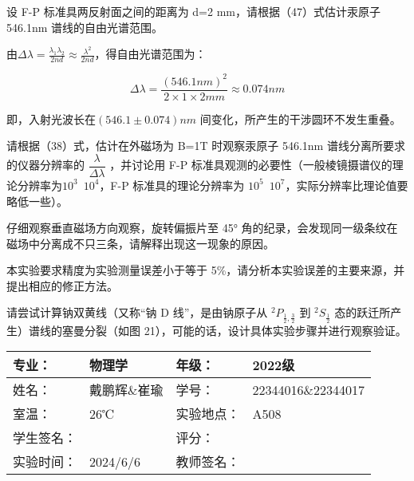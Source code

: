 \documentclass[dvipsnames, svgnames,a4paper,11pt]{article}
\begin{document}
\begin{question}
	设 F-P 标准具两反射面之间的距离为 d=2 mm，请根据（47）式估计汞原子 546.1nm 谱线的自由光谱范围。
\end{question}


	由$\Delta \lambda = \frac{\lambda_1 \lambda_2}{2 n d} \approx \frac{\lambda^2}{2 n d}$，得自由光谱范围为：

	\[
		\Delta \lambda = \frac{(546.1 nm)^2}{2 \times 1 \times 2mm} \approx 0.074nm
	\]


	即，入射光波长在$(546.1 \pm 0.074) nm$ 间变化，所产生的干涉圆环不发生重叠。



\begin{question}
	请根据（38）式，估计在外磁场为 B=1T 时观察汞原子 546.1nm 谱线分离所要求的仪器分辨率的 $\dfrac{\lambda}{\Delta \lambda}$ ，并讨论用 F-P 标准具观测的必要性（一般棱镜摄谱仪的理论分辨率为$10^3$~$10^4$，F-P 标准具的理论分辨率为 $10^5$~$10^7$，实际分辨率比理论值要略低一些）。
\end{question}





\begin{question}
	仔细观察垂直磁场方向观察，旋转偏振片至 45° 角的纪录，会发现同一级条纹在磁场中分离成不只三条，请解释出现这一现象的原因。
\end{question}







\begin{question}
	本实验要求精度为实验测量误差小于等于 5\%，请分析本实验误差的主要来源，并提出相应的修正方法。
\end{question}








\begin{question}
	请尝试计算钠双黄线（又称“钠 D 线”，是由钠原子从 $^2P_{\frac{1}{2}, \frac{3}{2}}$ 到 $^2S_{\frac{1}{2}}$ 态的跃迁所产生）谱线的塞曼分裂（如图 21），可能的话，设计具体实验步骤并进行观察验证。
\end{question}











\clearpage
\begin{table}
	\renewcommand\arraystretch{1.7}
	\centering
	\begin{tabularx}{\textwidth}{|X|X|X|X|}
	\hline
	专业：& 物理学 &年级：& 2022级 \\
	\hline
	姓名：& 戴鹏辉\&崔瑜 & 学号：& 22344016\&22344017 \\
	\hline
	室温：& 26℃ & 实验地点： & A508	\\
	\hline
	学生签名：& & 评分： &\\
	\hline
	实验时间：& 2024/6/6 & 教师签名：&\\
	\hline
	\end{tabularx}
\end{table}
\end{document}
